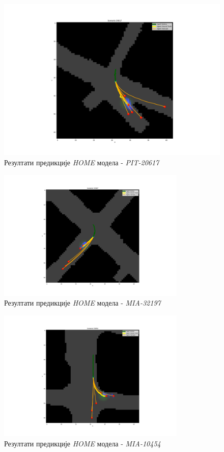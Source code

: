 \documentclass[11pt,oneside]{memoir}
\begin{document}
\begin{figure}[H]
  \centering
  \includegraphics[width=1.0\textwidth]{images/home_PIT_20617.png}
  \caption{Резултати предикције \textit{HOME} модела - \textit{PIT-20617} \label{home-PIT-20617}}
\end{figure}

\begin{figure}[H]
  \centering
  \includegraphics[width=0.8\textwidth]{images/home_MIA_32197.png}
  \caption{Резултати предикције \textit{HOME} модела - \textit{MIA-32197} \label{home-MIA-32197}}
\end{figure}

\begin{figure}[H]
  \centering
  \includegraphics[width=0.8\textwidth]{images/home_MIA_10454.png}
  \caption{Резултати предикције \textit{HOME} модела - \textit{MIA-10454} \label{home-MIA-10454}}
\end{figure}
\end{document}
